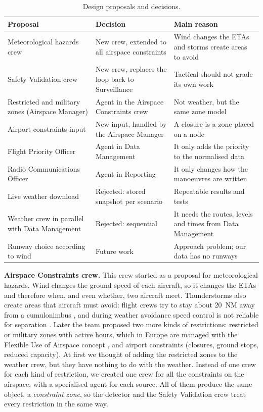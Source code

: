 \begin{table}[!htbp]
\centering
\small
\caption{Design proposals and decisions.}
\label{tab:proposals}
\begin{tabularx}{\textwidth}{@{}>{\raggedright\arraybackslash}p{4.3cm}
                               >{\raggedright\arraybackslash}p{3.9cm} X@{}}
\toprule
\textbf{Proposal} & \textbf{Decision} & \textbf{Main reason} \\
\midrule
Meteorological hazards crew
  & New crew, extended to all airspace constraints
  & Wind changes the ETAs and storms create areas to avoid \\
Safety Validation crew
  & New crew, replaces the loop back to Surveillance
  & Tactical should not grade its own work \\
Restricted and military zones (Airspace Manager)
  & Agent in the Airspace Constraints crew
  & Not weather, but the same zone model \\
Airport constraints input
  & New input, handled by the Airspace Manager
  & A closure is a zone placed on a node \\
Flight Priority Officer
  & Agent in Data Management
  & It only adds the priority to the normalised data \\
Radio Communications Officer
  & Agent in Reporting
  & It only changes how the manoeuvres are written \\
Live weather download
  & Rejected: stored snapshot per scenario
  & Repeatable results and tests \\
Weather crew in parallel with Data Management
  & Rejected: sequential
  &  It needs the routes, levels and times from Data Management \\
Runway choice according to wind
  & Future work
  & Approach problem; our data has no runways \\
\bottomrule
\end{tabularx}
\end{table}

\textbf{Airspace Constraints crew.} This crew started as a proposal for meteorological
hazards. Wind changes the ground speed of each aircraft, so it changes the ETAs and
therefore when, and even whether, two aircraft meet. Thunderstorms also create areas that
aircraft must avoid: flight crews try to stay about 20~NM away from a cumulonimbus
\cite{skybrary_wx_avoidance}, and during weather avoidance speed control is not reliable for
separation \cite{skybrary_wx_los}. Later the team proposed two more kinds of restrictions:
restricted or military zones with active hours, which in Europe are managed with the
Flexible Use of Airspace concept \cite{eurocontrol_ernip3}, and airport constraints
(closures, ground stops, reduced capacity). At first we thought of adding the restricted
zones to the weather crew, but they have nothing to do with the weather. Instead of one
crew for each kind of restriction, we created one crew for all the constraints on the
airspace, with a specialised agent for each source. All of them produce the same object, a
\emph{constraint zone}, so the detector and the Safety Validation crew treat every
restriction in the same way.

